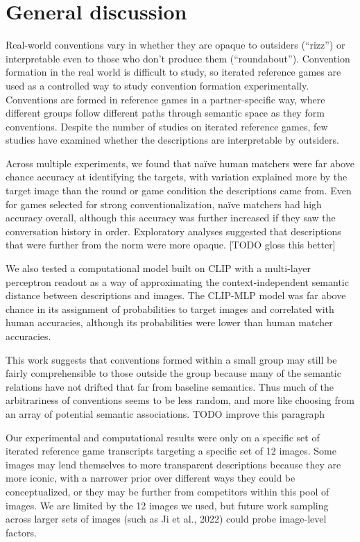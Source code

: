 \documentclass[10pt, letterpaper]{article}
\begin{document}
\section{General discussion}\label{general-discussion}

Real-world conventions vary in whether they are opaque to outsiders
(``rizz'') or interpretable even to those who don't produce them
(``roundabout''). Convention formation in the real world is difficult to
study, so iterated reference games are used as a controlled way to study
convention formation experimentally. Conventions are formed in reference
games in a partner-specific way, where different groups follow different
paths through semantic space as they form conventions. Despite the
number of studies on iterated reference games, few studies have examined
whether the descriptions are interpretable by outsiders.

Across multiple experiments, we found that naïve human matchers were far
above chance accuracy at identifying the targets, with variation
explained more by the target image than the round or game condition the
descriptions came from. Even for games selected for strong
conventionalization, naïve matchers had high accuracy overall, although
this accuracy was further increased if they saw the conversation history
in order. Exploratory analyses suggested that descriptions that were
further from the norm were more opaque. {[}TODO gloss this better{]}

We also tested a computational model built on CLIP with a multi-layer
perceptron readout as a way of approximating the context-independent
semantic distance between descriptions and images. The CLIP-MLP model
was far above chance in its assignment of probabilities to target images
and correlated with human accuracies, although its probabilities were
lower than human matcher accuracies.

This work suggests that conventions formed within a small group may
still be fairly comprehensible to those outside the group because many
of the semantic relations have not drifted that far from baseline
semantics. Thus much of the arbitrariness of conventions seems to be
less random, and more like choosing from an array of potential semantic
associations. TODO improve this paragraph

Our experimental and computational results were only on a specific set
of iterated reference game transcripts targeting a specific set of 12
images. Some images may lend themselves to more transparent descriptions
because they are more iconic, with a narrower prior over different ways
they could be conceptualized, or they may be further from competitors
within this pool of images. We are limited by the 12 images we used, but
future work sampling across larger sets of images (such as Ji et al.,
2022) could probe image-level factors.
\end{document}
